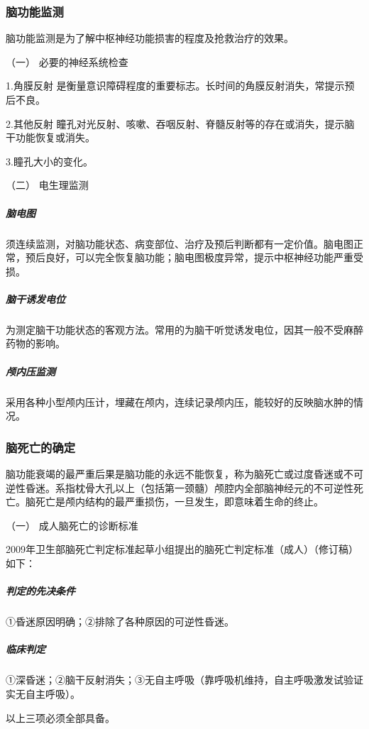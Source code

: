 \subsubsection{脑功能监测}

脑功能监测是为了解中枢神经功能损害的程度及抢救治疗的效果。

\hypertarget{text00067.htmlux5cux23CHP3-1-2-4-1}{}
（一） 必要的神经系统检查

1.角膜反射
是衡量意识障碍程度的重要标志。长时间的角膜反射消失，常提示预后不良。

2.其他反射
瞳孔对光反射、咳嗽、吞咽反射、脊髓反射等的存在或消失，提示脑干功能恢复或消失。

3.瞳孔大小的变化。

\hypertarget{text00067.htmlux5cux23CHP3-1-2-4-2}{}
（二） 电生理监测

\subparagraph{脑电图}

须连续监测，对脑功能状态、病变部位、治疗及预后判断都有一定价值。脑电图正常，预后良好，可以完全恢复脑功能；脑电图极度异常，提示中枢神经功能严重受损。

\subparagraph{脑干诱发电位}

为测定脑干功能状态的客观方法。常用的为脑干听觉诱发电位，因其一般不受麻醉药物的影响。

\subparagraph{颅内压监测}

采用各种小型颅内压计，埋藏在颅内，连续记录颅内压，能较好的反映脑水肿的情况。

\subsubsection{脑死亡的确定}

脑功能衰竭的最严重后果是脑功能的永远不能恢复，称为脑死亡或过度昏迷或不可逆性昏迷。系指枕骨大孔以上（包括第一颈髓）颅腔内全部脑神经元的不可逆性死亡。脑死亡是颅内结构的最严重损伤，一旦发生，即意味着生命的终止。

\hypertarget{text00067.htmlux5cux23CHP3-1-2-5-1}{}
（一） 成人脑死亡的诊断标准

2009年卫生部脑死亡判定标准起草小组提出的脑死亡判定标准（成人）（修订稿）如下：

\subparagraph{判定的先决条件}

①昏迷原因明确；②排除了各种原因的可逆性昏迷。

\subparagraph{临床判定}

①深昏迷；②脑干反射消失；③无自主呼吸（靠呼吸机维持，自主呼吸激发试验证实无自主呼吸）。

以上三项必须全部具备。


